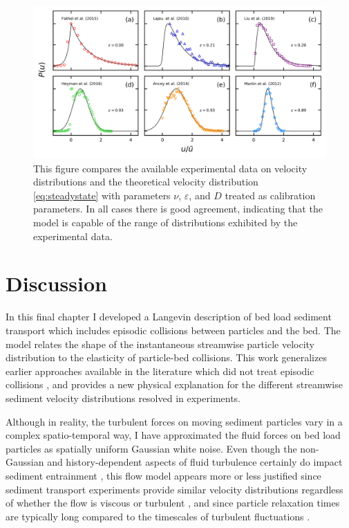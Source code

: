 \begin{figure}
	\centerline{\includegraphics{./figures/ch5/Fig4expComparison.png}}
	\caption{This figure compares the available experimental data on velocity distributions and the theoretical velocity distribution \ref{eq:steadystate} with parameters $\nu$, $\varepsilon$, and $D$ treated as calibration parameters. In all cases there is good agreement, indicating that the model is capable of the range of distributions exhibited by the experimental data.} \label{fig:fig4ch5}
\end{figure}


\section{Discussion}
\label{sec:langdiscussion}

In this final chapter I developed a Langevin description of bed load sediment transport which includes episodic collisions between particles and the bed.
The model relates the shape of the instantaneous streamwise particle velocity distribution to the elasticity of particle-bed collisions.
This work generalizes earlier approaches available in the literature which did not treat episodic collisions \citep{Ancey2014,Fan2014}, and provides a new physical explanation for the different streamwise sediment velocity distributions resolved in experiments.

Although in reality, the turbulent forces on moving sediment particles vary in a complex spatio-temporal way, I have approximated the fluid forces on bed load particles as spatially uniform Gaussian white noise. Even though the non-Gaussian and history-dependent aspects of fluid turbulence certainly do impact sediment entrainment \citep{Cameron2020,Celik2014}, this flow model appears more or less justified since sediment transport experiments provide similar velocity distributions regardless of whether the flow is viscous or turbulent \citep{Lajeunesse2010, Charru2004}, and since particle relaxation times are typically long compared to the timescales of turbulent fluctuations \citep{Hofland2006,Schmeeckle2007,Nakagawa1981}.

